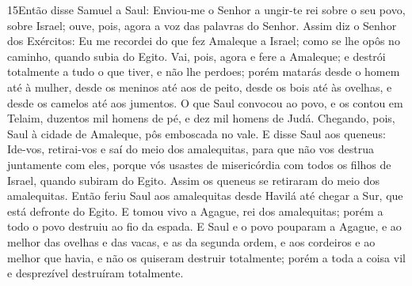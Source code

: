 \lettrine{15} Então disse Samuel a Saul: Enviou-me o Senhor a
ungir-te rei sobre o seu povo, sobre Israel; ouve, pois, agora a voz
das palavras do Senhor. Assim diz o Senhor dos Exércitos: Eu me
recordei do que fez Amaleque a Israel; como se lhe opôs no caminho,
quando subia do Egito. Vai, pois, agora e fere a Amaleque; e
destrói totalmente a tudo o que tiver, e não lhe perdoes; porém
matarás desde o homem até à mulher, desde os meninos até aos de
peito, desde os bois até às ovelhas, e desde os camelos até aos
jumentos. O que Saul convocou ao povo, e os contou em Telaim,
duzentos mil homens de pé, e dez mil homens de Judá. Chegando,
pois, Saul à cidade de Amaleque, pôs emboscada no vale. E disse
Saul aos queneus: Ide-vos, retirai-vos e saí do meio dos
amalequitas, para que não vos destrua juntamente com eles, porque
vós usastes de misericórdia com todos os filhos de Israel, quando
subiram do Egito. Assim os queneus se retiraram do meio dos
amalequitas. Então feriu Saul aos amalequitas desde Havilá até
chegar a Sur, que está defronte do Egito. E tomou vivo a Agague,
rei dos amalequitas; porém a todo o povo destruiu ao fio da espada.
E Saul e o povo pouparam a Agague, e ao melhor das ovelhas e das
vacas, e as da segunda ordem, e aos cordeiros e ao melhor que havia,
e não os quiseram destruir totalmente; porém a toda a coisa vil e
desprezível destruíram totalmente.


